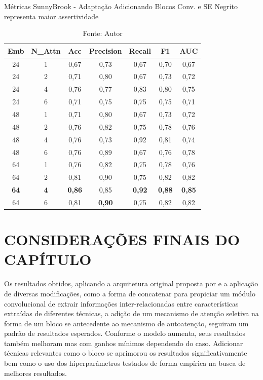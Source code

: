 \begin{table}[htbp]
\centering
\caption{Métricas SunnyBrook - Adaptação Adicionando Blocos Conv. e SE
\newline Negrito representa maior assertividade}
\begin{tabular}{ccccccc}
\toprule
\textbf{Emb} & \textbf{N\_Attn} & \textbf{Acc} & \textbf{Precision} & \textbf{Recall} & \textbf{F1} & \textbf{AUC} \\
\midrule
24 & 1 & 0,67 & 0,73 & 0,67 & 0,70 & 0,67 \\
24 & 2 & 0,71 & 0,80 & 0,67 & 0,73 & 0,72 \\
24 & 4 & 0,76 & 0,77 & 0,83 & 0,80 & 0,75 \\
24 & 6 & 0,71 & 0,75 & 0,75 & 0,75 & 0,71 \\
48 & 1 & 0,71 & 0,80 & 0,67 & 0,73 & 0,72 \\
48 & 2 & 0,76 & 0,82 & 0,75 & 0,78 & 0,76 \\
48 & 4 & 0,76 & 0,73 & 0,92 & 0,81 & 0,74 \\
48 & 6 & 0,76 & 0,89 & 0,67 & 0,76 & 0,78 \\
64 & 1 & 0,76 & 0,82 & 0,75 & 0,78 & 0,76 \\
64 & 2 & 0,81 & 0,90 & 0,75 & 0,82 & 0,82 \\
\textbf{64} & \textbf{4} & \textbf{0,86} & 0,85 & \textbf{0,92} & \textbf{0,88} & \textbf{0,85} \\
64 & 6 & 0,81 & \textbf{0,90} & 0,75 & 0,82 & 0,82 \\
\bottomrule
\end{tabular}
\caption*{Fonte: Autor}
\label{tab:metrics_sunny_se}
\end{table}

\section{CONSIDERAÇÕES FINAIS DO CAPÍTULO} 
\label{sec:cap6_consideracoes_finais}

Os resultados obtidos, aplicando a arquitetura original proposta por  e a aplicação de diversas modificações, como a forma de concatenar para propiciar um módulo convolucional de extrair informações inter-relacionadas entre características extraídas de diferentes técnicas, a adição de um mecanismo de atenção seletiva na forma de um bloco \gls{se} antecedente ao mecanismo de autoatenção, seguiram um padrão de resultados esperados. Conforme o modelo aumenta, seus resultados também melhoram mas com ganhos mínimos dependendo do caso. Adicionar técnicas relevantes como o bloco \gls{se} aprimorou os resultados significativamente bem como o uso dos hiperparâmetros testados de forma empírica na busca de melhores resultados. 

